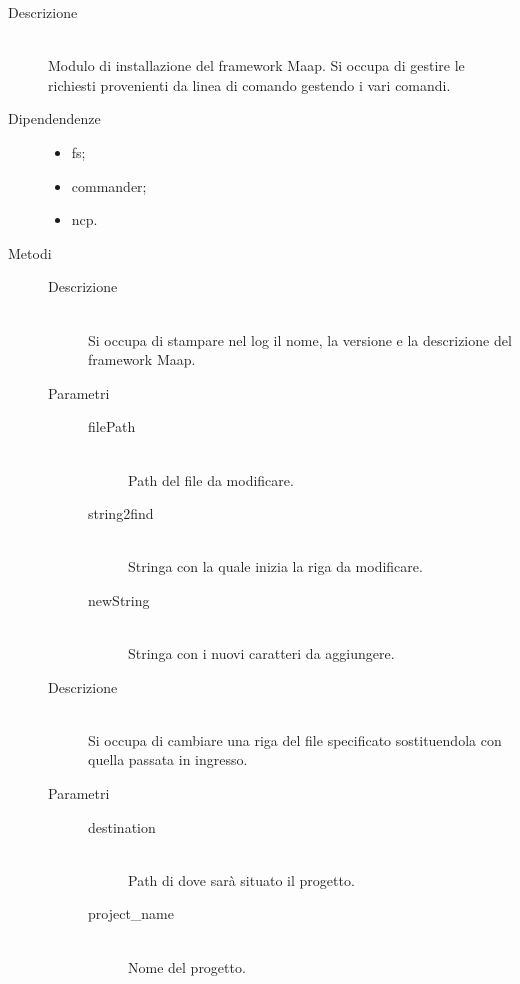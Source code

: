 \begin{description}
 \item[Descrizione] \hfill \\
Modulo di installazione del framework Maap. Si occupa di gestire le richiesti provenienti da linea di comando gestendo i vari comandi.
 \item[Dipendendenze] \hfill
 \begin{itemize}
 	\item fs;
 	\item commander;
 	\item ncp.
 \end{itemize}
 \item[Metodi]
  \begin{mldescription}
    \hfill
   \begin{description}
    \item[Descrizione] \hfill \\
    Si occupa di stampare nel log il nome, la versione e la descrizione del framework Maap.
   \end{description}
  
    \hfill
      \begin{description}
      	    \item[Parametri] \hfill 
      	     \begin{description}
      	      \item[filePath] \hfill \\
      	      Path del file da modificare.
      	      \item[string2find] \hfill \\
      	      Stringa con la quale inizia la riga da modificare.
      	      \item[newString] \hfill \\
      	      Stringa con i nuovi caratteri da aggiungere.
      	     \end{description}
      	    
       \item[Descrizione] \hfill \\
      Si occupa di cambiare una riga del file specificato sostituendola con quella passata in ingresso.
      \end{description}

    \hfill
   \begin{description}
   \item[Parametri] \hfill 
         	     \begin{description}
         	      \item[destination] \hfill \\
         	      Path di dove sarà situato il progetto.
         	      \item[project\_name] \hfill \\
         	      Nome del progetto.
         	      

\end{description}
\end{description}
\end{mldescription}
\end{description}
